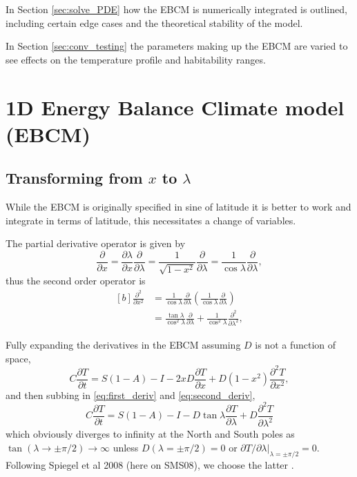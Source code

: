 \documentclass[12pt, onecolumn]{revtex4-2}    %
\begin{document}
In Section \ref{sec:solve_PDE} how the EBCM is numerically integrated is outlined, including certain edge cases and the theoretical stability of the model.

In Section \ref{sec:conv_testing} the parameters making up the EBCM are varied to see effects on the temperature profile and habitability ranges.

\section{1D Energy Balance Climate model (EBCM)} \label{sec:ebcmodel}

\subsection{Transforming from $x$ to $\lambda$}

While the EBCM is originally specified in sine of latitude it is better to work and integrate in terms of latitude, this necessitates a change of variables.

The partial derivative operator is given by
\begin{equation}
    \frac{\partial}{\partial x} = \frac{\partial \lambda}{\partial x} \frac {\partial} {\partial \lambda}
    = \frac{1}{\sqrt{1-x^2}} \frac {\partial} {\partial \lambda}
    = \frac{1}{\cos \lambda} \frac {\partial} {\partial \lambda},
    \label{eq:first_deriv}
\end{equation}
thus the second order operator is
\begin{equation}
    \begin{aligned}[b]
        \frac{\partial^2}{\partial x^2} & = \frac{1}{\cos\lambda} \frac{\partial}{\partial \lambda} \left( \frac{1}{\cos\lambda} \frac{\partial}{\partial \lambda} \right)      \\
                                        & = \frac{\tan\lambda}{\cos^2\lambda}\frac{\partial}{\partial \lambda} + \frac{1}{\cos^2\lambda} \frac{\partial^2}{\partial \lambda^2},
    \end{aligned}
    \label{eq:second_deriv}
\end{equation}

Fully expanding the derivatives in the EBCM assuming $D$ is not a function of space,
\begin{equation}
    C \frac{\partial T}{\partial t} = S(1-A) - I
    - 2 x D \frac{\partial T}{\partial x}
    + D (1-x^2) \frac{\partial^2 T}{\partial x^2},
    \label{eq:expanded}
\end{equation}
and then subbing in \eqref{eq:first_deriv} and \eqref{eq:second_deriv},
\begin{equation}
    C \frac{\partial T}{\partial t} = S(1-A) - I
    - D \tan\lambda \frac{\partial T}{\partial \lambda}
    + D \frac{\partial^2 T}{\partial \lambda^2}
    \label{eq:PDE_in_lat}
\end{equation}
which obviously diverges to infinity at the North and South poles as $\tan(\lambda \rightarrow \pm \pi/2) \rightarrow \infty$ unless $D(\lambda = \pm \pi/2) = 0$ or $\partial T / \partial \lambda|_{\lambda=\pm \pi/2} = 0$.
Following Spiegel et al 2008 (here on SMS08), we choose the latter \cite{SMS08}.
\end{document}
